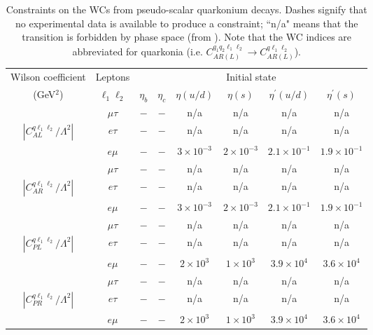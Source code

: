 \documentclass[12pt]{article}
\begin{document}
\begin{table*}
\begin{center}
\footnotesize
\begin{tabular}{cccccccc}
\hline \hline
 Wilson coefficient & Leptons &\multicolumn{6}{c}{Initial state}\\
 (GeV$^2$) & $\ell_1 \ell_2$ & $\eta_b$ & $\eta_c$ & $\eta (u/d)$ & $\eta (s)$ & $\eta^\prime (u/d)$ & $\eta^\prime (s)$\\ \hline
$~$ & $\mu \tau$ & $-$ & $-$ & n/a & n/a & n/a & n/a\\
%
$\left| {C_{AL}^{q\ell_1\ell_2}}/{\Lambda^2} \right|$ & $e \tau$ & $-$ & $-$ & n/a & n/a & n/a & n/a \\
%
$~$ & $e \mu$ & $-$ & $-$ & $3 \times 10^{-3}$ & $2 \times 10^{-3}$ & $2.1 \times 10^{-1}$ & $1.9 \times 10^{-1}$\\
\hline
$~$ & $\mu \tau$ & $-$ & $-$ & n/a & n/a & n/a & n/a\\
%
$\left| {C_{AR}^{q\ell_1\ell_2}}/{\Lambda^2} \right|$ & $e \tau$ & $-$ & $-$ & n/a & n/a & n/a & n/a\\
%
$~$ & $e \mu$ & $-$ & $-$ & $3 \times 10^{-3}$ & $2 \times 10^{-3}$ & $2.1 \times 10^{-1}$ & $1.9 \times 10^{-1}$\\
\hline
$~$ & $\mu \tau$ & $-$ & $-$ & n/a & n/a & n/a & n/a\\
%
$\left| {C_{PL}^{q\ell_1\ell_2}}/{\Lambda^2} \right|$ & $e \tau$ & $-$ & $-$ & n/a & n/a & n/a & n/a\\
%
$~$ & $e \mu$ & $-$ & $-$ & $2 \times 10^{3}$ & $1 \times 10^{3}$ & $3.9 \times 10^{4}$ & $3.6 \times 10^{4}$\\
\hline
$~$ & $\mu \tau$ & $-$ & $-$ & n/a & n/a & n/a & n/a\\
%
$\left| {C_{PR}^{q\ell_1\ell_2}}/{\Lambda^2} \right|$ & $e \tau$ & $-$ & $-$ & n/a & n/a & n/a & n/a\\
%
$~$ & $e \mu$ & $-$ & $-$ & $2 \times 10^{3}$ & $1 \times 10^{3}$ & $3.9 \times 10^{4}$ & $3.6 \times 10^{4}$\\
\hline \hline
\end{tabular}
\end{center}
\caption{\label{tab:P4fermionqq}Constraints on the WCs from pseudo-scalar quarkonium decays. Dashes signify that 
no experimental data is available to produce a constraint; ``n/a" means that the transition is forbidden by phase space (from \cite{Hazard:2016fnc}). Note that the WC indices are abbreviated for quarkonia (i.e. $C_{AR(L)}^{q_1 q_2 \ell_1 \ell_2} \to C_{AR(L)}^{q \ell_1 \ell_2}$).}
\end{table*}
\end{document}
